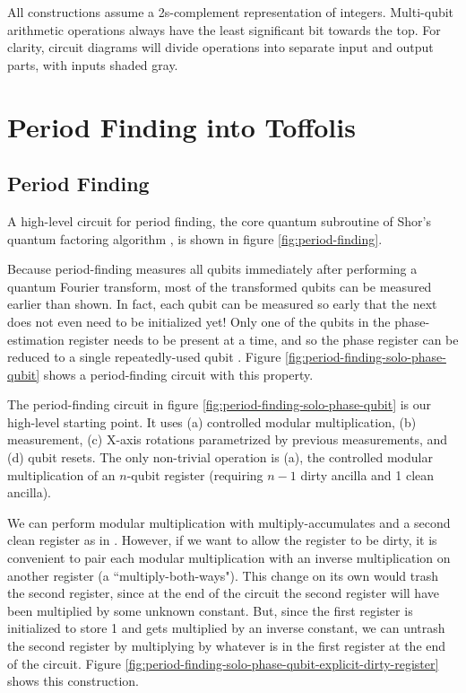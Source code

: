\documentclass[twocolumn]{article}
\begin{document}
All constructions assume a 2s-complement representation of integers.
Multi-qubit arithmetic operations always have the least significant bit towards the top.
For clarity, circuit diagrams will divide operations into separate input and output parts, with inputs shaded gray.



\section{Period Finding into Toffolis} \label{sec:construct}

\subsection{Period Finding}

A high-level circuit for period finding, the core quantum subroutine of Shor's quantum factoring algorithm \cite{Shor1999}, is shown in figure \ref{fig:period-finding}.

Because period-finding measures all qubits immediately after performing a quantum Fourier transform, most of the transformed qubits can be measured earlier than shown.
In fact, each qubit can be measured so early that the next does not even need to be initialized yet!
Only one of the qubits in the phase-estimation register needs to be present at a time, and so the phase register can be reduced to a single repeatedly-used qubit \cite{beauregard2003}.
Figure \ref{fig:period-finding-solo-phase-qubit} shows a period-finding circuit with this property.

The period-finding circuit in figure \ref{fig:period-finding-solo-phase-qubit} is our high-level starting point.
It uses (a) controlled modular multiplication, (b) measurement, (c) X-axis rotations parametrized by previous measurements, and (d) qubit resets.
The only non-trivial operation is (a), the controlled modular multiplication of an $n$-qubit register (requiring $n-1$ dirty ancilla and 1 clean ancilla).

We can perform modular multiplication with multiply-accumulates and a second clean register as in \cite{beauregard2003}.
However, if we want to allow the register to be dirty, it is convenient to pair each modular multiplication with an inverse multiplication on another register (a ``multiply-both-ways").
This change on its own would trash the second register, since at the end of the circuit the second register will have been multiplied by some unknown constant.
But, since the first register is initialized to store 1 and gets multiplied by an inverse constant, we can untrash the second register by multiplying by whatever is in the first register at the end of the circuit.
Figure \ref{fig:period-finding-solo-phase-qubit-explicit-dirty-register} shows this construction.
\end{document}
